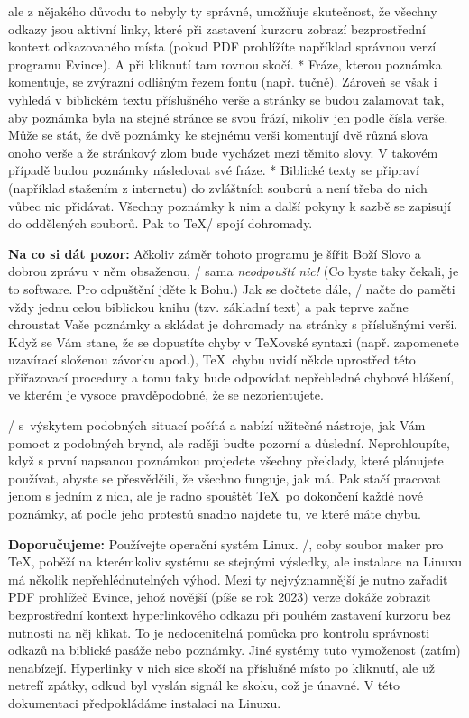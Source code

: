 {    ale z nějakého důvodu to nebyly ty správné,
    umožňuje skutečnost, že všechny odkazy jsou  aktivní linky, které při zastavení kurzoru zobrazí bezprostřední kontext
   odkazovaného místa (pokud PDF prohlížíte například správnou verzí programu Evince). A  při kliknutí tam rovnou skočí. 
  * Fráze, kterou poznámka komentuje, se zvýrazní odlišným řezem fontu (např. tučně).
    Zároveň se však i vyhledá v biblickém textu příslušného verše a stránky se budou zalamovat
   tak, aby poznámka byla na stejné stránce se svou frází, nikoliv jen podle čísla verše. Může
   se stát, že dvě poznámky ke stejnému verši komentují dvě různá slova  onoho verše a že
   stránkový zlom bude vycházet mezi těmito slovy. V takovém případě  budou poznámky následovat
   své fráze.
   * Biblické texty se připraví (například stažením z internetu) do zvláštních souborů a není třeba do nich vůbec nic přidávat. Všechny poznámky k nim a další pokyny k sazbě se zapisují do oddělených souborů. Pak to \TeX/ spojí dohromady.
    \enditems
\enditems

{\bf Na co si dát pozor:} Ačkoliv záměr tohoto programu je šířit Boží Slovo a dobrou zprávu v něm obsaženou, \OpBible/ sama {\it neodpouští nic!\/} (Co byste taky čekali, je to
software. Pro odpuštění jděte k Bohu.) Jak se dočtete dále, \OpBible/ načte do paměti vždy jednu celou biblickou knihu (tzv. základní text) a pak teprve začne chroustat Vaše
poznámky a skládat je dohromady na stránky s příslušnými verši. Když se Vám stane, že se dopustíte chyby v \TeX ovské syntaxi (např. zapomenete uzavírací složenou závorku apod.), \TeX\ chybu uvidí někde uprostřed této přiřazovací procedury a tomu taky bude odpovídat nepřehledné chybové hlášení, ve kterém je vysoce pravděpodobné, že se nezorientujete.

\OpBible/ s~výskytem podobných situací počítá a nabízí užitečné nástroje, jak Vám pomoct z podobných brynd, ale raději buďte pozorní a důslední. Neprohloupíte, když s první napsanou
poznámkou projedete všechny překlady, které plánujete používat, abyste se přesvědčili, že všechno funguje, jak má.  Pak stačí pracovat jenom s jedním z nich, ale je radno
spouštět \TeX\ po dokončení každé nové poznámky, ať podle jeho protestů snadno najdete tu, ve které máte chybu.

{\bf Doporučujeme:} Používejte operační systém Linux. \OpBible/, coby soubor maker pro \TeX, poběží na kterémkoliv systému se stejnými výsledky, ale instalace na Linuxu má několik
nepřehlédnutelných výhod. Mezi ty nejvýznamnější je nutno zařadit PDF prohlížeč Evince, jehož novější (píše se rok 2023) verze dokáže zobrazit bezprostřední kontext hyperlinkového
odkazu při pouhém zastavení kurzoru bez nutnosti na něj klikat. To je nedocenitelná pomůcka pro kontrolu správnosti odkazů na biblické pasáže nebo poznámky.
Jiné systémy tuto vymoženost (zatím) nenabízejí. Hyperlinky v nich sice skočí na příslušné místo po kliknutí, ale už netrefí zpátky, odkud byl vyslán signál ke skoku, což je únavné. V této dokumentaci předpokládáme instalaci na Linuxu.

}
